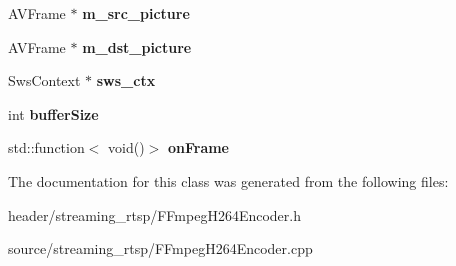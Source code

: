 \begin{DoxyCompactItemize}
A\+V\+Frame $\ast$ {\bfseries m\+\_\+src\+\_\+picture}
\item 
\mbox{\label{class_m_e_s_a_i_1_1_f_fmpeg_h264_encoder_a59e92e41755307d60458e22f0d30d7dd}} 
A\+V\+Frame $\ast$ {\bfseries m\+\_\+dst\+\_\+picture}
\item 
\mbox{\label{class_m_e_s_a_i_1_1_f_fmpeg_h264_encoder_a7b92e8f2e33eed0a0a5d7f45e4716373}} 
Sws\+Context $\ast$ {\bfseries sws\+\_\+ctx}
\item 
\mbox{\label{class_m_e_s_a_i_1_1_f_fmpeg_h264_encoder_ab9b0bc201537563c8fd57de283c05636}} 
int {\bfseries buffer\+Size}
\item 
\mbox{\label{class_m_e_s_a_i_1_1_f_fmpeg_h264_encoder_a29f241ccd3a0e04fd1e6d3c36c2a4e06}} 
std\+::function$<$ void()$>$ {\bfseries on\+Frame}
\end{DoxyCompactItemize}


The documentation for this class was generated from the following files\+:\begin{DoxyCompactItemize}
\item 
header/streaming\+\_\+rtsp/F\+Fmpeg\+H264\+Encoder.\+h\item 
source/streaming\+\_\+rtsp/F\+Fmpeg\+H264\+Encoder.\+cpp\end{DoxyCompactItemize}
